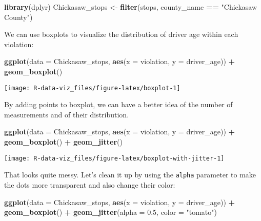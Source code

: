 \documentclass[]{book}
\newenvironment{Shaded}{\begin{snugshade}}{\end{snugshade}}
\newcommand{\KeywordTok}[1]{\textcolor[rgb]{0.13,0.29,0.53}{\textbf{#1}}}
\newcommand{\DataTypeTok}[1]{\textcolor[rgb]{0.13,0.29,0.53}{#1}}
\newcommand{\FloatTok}[1]{\textcolor[rgb]{0.00,0.00,0.81}{#1}}
\newcommand{\StringTok}[1]{\textcolor[rgb]{0.31,0.60,0.02}{#1}}
\newcommand{\OperatorTok}[1]{\textcolor[rgb]{0.81,0.36,0.00}{\textbf{#1}}}
\newcommand{\NormalTok}[1]{#1}
\theoremstyle{definition}
\theoremstyle{definition}
\theoremstyle{definition}
\theoremstyle{remark}
\begin{document}
\begin{Shaded}
\begin{Highlighting}[]
\KeywordTok{library}\NormalTok{(dplyr)}
\NormalTok{Chickasaw_stops <-}\StringTok{ }\KeywordTok{filter}\NormalTok{(stops, county_name }\OperatorTok{==}\StringTok{ "Chickasaw County"}\NormalTok{)}
\end{Highlighting}
\end{Shaded}

We can use boxplots to visualize the distribution of driver age within
each violation:

\begin{Shaded}
\begin{Highlighting}[]
\KeywordTok{ggplot}\NormalTok{(}\DataTypeTok{data =}\NormalTok{ Chickasaw_stops, }\KeywordTok{aes}\NormalTok{(}\DataTypeTok{x =}\NormalTok{ violation, }\DataTypeTok{y =}\NormalTok{ driver_age)) }\OperatorTok{+}
\StringTok{    }\KeywordTok{geom_boxplot}\NormalTok{()}
\end{Highlighting}
\end{Shaded}

\texttt{[image: R-data-viz\_files/figure-latex/boxplot-1]}

By adding points to boxplot, we can have a better idea of the number of
measurements and of their distribution.

\begin{Shaded}
\begin{Highlighting}[]
\KeywordTok{ggplot}\NormalTok{(}\DataTypeTok{data =}\NormalTok{ Chickasaw_stops, }\KeywordTok{aes}\NormalTok{(}\DataTypeTok{x =}\NormalTok{ violation, }\DataTypeTok{y =}\NormalTok{ driver_age)) }\OperatorTok{+}
\StringTok{    }\KeywordTok{geom_boxplot}\NormalTok{() }\OperatorTok{+}
\StringTok{    }\KeywordTok{geom_jitter}\NormalTok{()}
\end{Highlighting}
\end{Shaded}

\texttt{[image: R-data-viz\_files/figure-latex/boxplot-with-jitter-1]}

That looks quite messy. Let's clean it up by using the \texttt{alpha}
parameter to make the dots more transparent and also change their color:

\begin{Shaded}
\begin{Highlighting}[]
\KeywordTok{ggplot}\NormalTok{(}\DataTypeTok{data =}\NormalTok{ Chickasaw_stops, }\KeywordTok{aes}\NormalTok{(}\DataTypeTok{x =}\NormalTok{ violation, }\DataTypeTok{y =}\NormalTok{ driver_age)) }\OperatorTok{+}
\StringTok{    }\KeywordTok{geom_boxplot}\NormalTok{() }\OperatorTok{+}
\StringTok{    }\KeywordTok{geom_jitter}\NormalTok{(}\DataTypeTok{alpha =} \FloatTok{0.5}\NormalTok{, }\DataTypeTok{color =} \StringTok{"tomato"}\NormalTok{)}
\end{Highlighting}
\end{Shaded}
\end{document}
